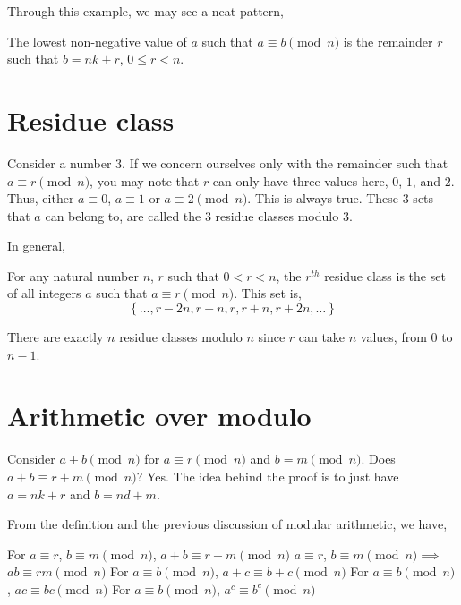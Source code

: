 Through this example, we may see a neat pattern,

\begin{lemma}
    The lowest non-negative value of \(a\) such that \(a \equiv b \pmod{n}\) is the remainder \(r\)
    such that \(b = nk + r\), \(0 \le r < n\). 
\end{lemma}

\section{Residue class}

Consider a number \(3\). If we concern ourselves only with the remainder such that \(a \equiv r \pmod{n}\),
you may note that \(r\) can only have three values here, \(0\), \(1\), and \(2\). Thus, either
\(a \equiv 0\), \(a \equiv 1\) or \(a \equiv 2 \pmod{n}\). This is always true. These \(3\) sets
that \(a\) can belong to, are called the \(3\) residue classes modulo \(3\).

In general,

\begin{definition}
    For any natural number \(n\), \(r\) such that \(0 < r < n\), the \(r^{th}\) residue class is
    the set of all integers \(a\) such that \(a \equiv r \pmod{n}\). This set is,
    \[
        \left\{\dots, r - 2n, r - n, r, r + n, r + 2n, \dots\right\}
    \]
\end{definition}

There are exactly \(n\) residue classes modulo \(n\) since \(r\) can take \(n\) values, from \(0\)
to \(n - 1\).

\section{Arithmetic over modulo}

Consider \(a + b \pmod{n}\) for \(a \equiv r \pmod{n}\) and \(b = m \pmod{n}\). Does \(a + b \equiv r + m
\pmod{n}\)? Yes. The idea behind the proof is to just have \(a = nk + r\) and \(b = nd + m\). 

\begin{proposition}
    From the definition and the previous discussion of modular arithmetic, we have,
    \begin{enumerate}
        \ii For \(a \equiv r\), \(b \equiv m \pmod{n}\), \(a + b \equiv r + m \pmod{n}\)
        \ii \(a \equiv r\), \(b \equiv m \pmod{n} \implies\) \(ab \equiv rm \pmod{n}\)
        \ii For \(a \equiv b \pmod{n}\), \(a + c \equiv b + c \pmod{n}\)
        \ii For \(a \equiv b \pmod{n}\), \(ac \equiv bc \pmod{n}\)
        \ii For \(a \equiv b \pmod{n}\), \(a^c \equiv b^c \pmod{n}\)
    \end{enumerate}
\end{proposition}